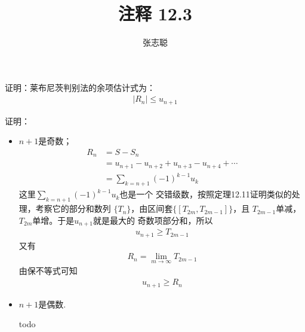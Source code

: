 \documentclass{article}
\begin{document}
\title{注释 12.3}
\author{张志聪}
\maketitle

\begin{zremark}
  证明：莱布尼茨判别法的余项估计式为：
  \begin{align*}
    |R_n| \leq u_{n + 1}
  \end{align*}
\end{zremark}
证明：
\begin{itemize}
  \item $n + 1$是奇数；
        \begin{align*}
          R_n & = S - S_n                                          \\
              & = u_{n + 1} - u_{n+2} + u_{n+3} - u_{n+4} + \cdots \\
              & = \sum\limits_{k = n + 1} (-1)^{k - 1} u_k
        \end{align*}
        这里$\sum\limits_{k = n + 1} (-1)^{k - 1} u_k$也是一个
        交错级数，按照定理12.11证明类似的处理，考察它的部分和数列
        $\{T_n\}$，由区间套$\{[T_{2m}, T_{2m - 1}]\}$，且
        $T_{2m - 1}$单减，$T_{2m}$单增。于是$u_{n + 1}$就是最大的
        奇数项部分和，所以
        \begin{align*}
          u_{n + 1} \geq T_{2m - 1}
        \end{align*}
        又有
        \begin{align*}
          R_n = \lim\limits_{m \to \infty} T_{2m - 1}
        \end{align*}
        由保不等式可知
        \begin{align*}
          u_{n + 1} \geq R_n
        \end{align*}

  \item $n + 1$是偶数.

        todo
\end{itemize}
\end{document}
